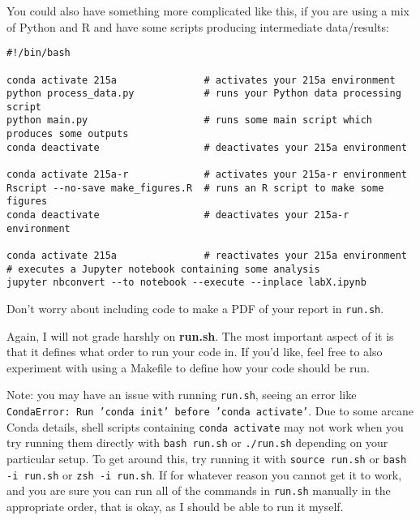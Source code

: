 \documentclass[letterpaper,12pt]{article}
\begin{document}
You could also have something more complicated like this, if you are using a mix of Python and R and have some scripts producing intermediate data/results:
\begin{verbatim}
#!/bin/bash

conda activate 215a               # activates your 215a environment
python process_data.py            # runs your Python data processing script
python main.py                    # runs some main script which produces some outputs
conda deactivate                  # deactivates your 215a environment

conda activate 215a-r             # activates your 215a-r environment
Rscript --no-save make_figures.R  # runs an R script to make some figures
conda deactivate                  # deactivates your 215a-r environment

conda activate 215a               # reactivates your 215a environment
# executes a Jupyter notebook containing some analysis
jupyter nbconvert --to notebook --execute --inplace labX.ipynb
\end{verbatim}
Don't worry about including code to make a PDF of your report in \texttt{run.sh}.

Again, I will not grade harshly on \textbf{run.sh}. The most important aspect of it is that it defines what order to run your code in. If you'd like, feel free to also experiment with using a Makefile to define how your code should be run.

Note: you may have an issue with running \texttt{run.sh}, seeing an error like \texttt{CondaError:  Run 'conda init' before 'conda activate'}. Due to some arcane Conda details, shell scripts containing \texttt{conda activate} may not work when you try running them directly with \texttt{bash run.sh} or \texttt{./run.sh} depending on your particular setup. To get around this, try running it with \texttt{source run.sh} or \texttt{bash -i run.sh}  or \texttt{zsh -i run.sh}. If for whatever reason you cannot get it to work, and you are sure you can run all of the commands in \texttt{run.sh} manually in the appropriate order, that is okay, as I should be able to run it myself.
\end{document}
